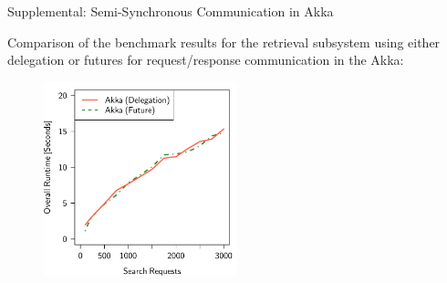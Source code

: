 \documentclass{beamer}
\begin{document}
\begin{frame}{Supplemental: Semi-Synchronous Communication in Akka}

Comparison of the benchmark results for the retrieval subsystem using either delegation or futures for request/response communication in the Akka:

\begin{center}
  \begin{figure} 
    \includegraphics[width=0.5\textwidth]{graphics/eval-search-comparison-akka-delegation-future.pdf} 
  \end{figure}
\end{center}

\end{frame}

\end{document}
